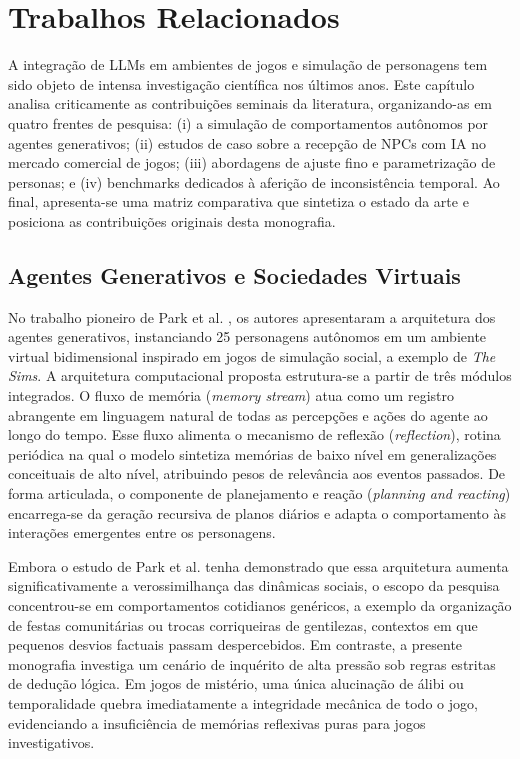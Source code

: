 \chapter{Trabalhos Relacionados}
\label{cap:relacionados}

A integração de LLMs em ambientes de jogos e simulação de personagens tem sido objeto de intensa investigação científica nos últimos anos. Este capítulo analisa criticamente as contribuições seminais da literatura, organizando-as em quatro frentes de pesquisa: (i) a simulação de comportamentos autônomos por agentes generativos; (ii) estudos de caso sobre a recepção de NPCs com IA no mercado comercial de jogos; (iii) abordagens de ajuste fino e parametrização de personas; e (iv) benchmarks dedicados à aferição de inconsistência temporal. Ao final, apresenta-se uma matriz comparativa que sintetiza o estado da arte e posiciona as contribuições originais desta monografia.

\section{Agentes Generativos e Sociedades Virtuais}
\label{sec:rel_park}

No trabalho pioneiro de Park et al. \cite{park2023generative}, os autores apresentaram a arquitetura dos agentes generativos, instanciando 25 personagens autônomos em um ambiente virtual bidimensional inspirado em jogos de simulação social, a exemplo de \textit{The Sims}. A arquitetura computacional proposta estrutura-se a partir de três módulos integrados. O fluxo de memória (\textit{memory stream}) atua como um registro abrangente em linguagem natural de todas as percepções e ações do agente ao longo do tempo. Esse fluxo alimenta o mecanismo de reflexão (\textit{reflection}), rotina periódica na qual o modelo sintetiza memórias de baixo nível em generalizações conceituais de alto nível, atribuindo pesos de relevância aos eventos passados. De forma articulada, o componente de planejamento e reação (\textit{planning and reacting}) encarrega-se da geração recursiva de planos diários e adapta o comportamento às interações emergentes entre os personagens.

Embora o estudo de Park et al. \cite{park2023generative} tenha demonstrado que essa arquitetura aumenta significativamente a verossimilhança das dinâmicas sociais, o escopo da pesquisa concentrou-se em comportamentos cotidianos genéricos, a exemplo da organização de festas comunitárias ou trocas corriqueiras de gentilezas, contextos em que pequenos desvios factuais passam despercebidos. Em contraste, a presente monografia investiga um cenário de inquérito de alta pressão sob regras estritas de dedução lógica. Em jogos de mistério, uma única alucinação de álibi ou temporalidade quebra imediatamente a integridade mecânica de todo o jogo, evidenciando a insuficiência de memórias reflexivas puras para jogos investigativos.

